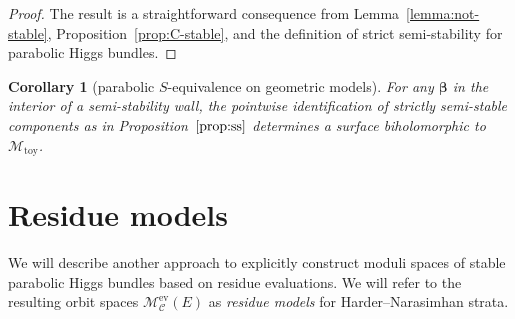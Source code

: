 \documentclass[10pt,a4paper]{amsart}
\newcommand{\curly}[1]{\mathscr{#1}}
\newcommand{\cM}{\curly{M}}
\newcommand{\qC}{\mathcal{C}}
\numberwithin{equation}{section}
\newtheorem{Corollary}[Theorem]{Corollary}
\begin{document}
\begin{proof}
The result is a straightforward consequence from Lemma~\ref{lemma:not-stable}, Proposition~\ref{prop:C-stable}, and the definition of strict semi-stability for parabolic Higgs bundles.
\end{proof}

\begin{Corollary}[parabolic $S$-equivalence on geometric models]
For any $\pmb{\beta}$ in the interior of a semi-stability wall, the pointwise identification of strictly semi-stable components as in Proposition~$\ref{prop:ss}$ determines a surface biholomorphic to $\cM_{\mathrm{toy}}$.
\end{Corollary}

\appendix

\section{Residue models}\label{sec:Res-mod}


We will describe another approach to explicitly construct moduli spaces of stable parabolic Higgs bundles based on residue evaluations. We will refer to the resulting orbit spaces $\cM^{\mathrm{ev}}_{\qC}(E)$ as \textit{residue models} for Harder--Narasimhan strata.
\end{document}
